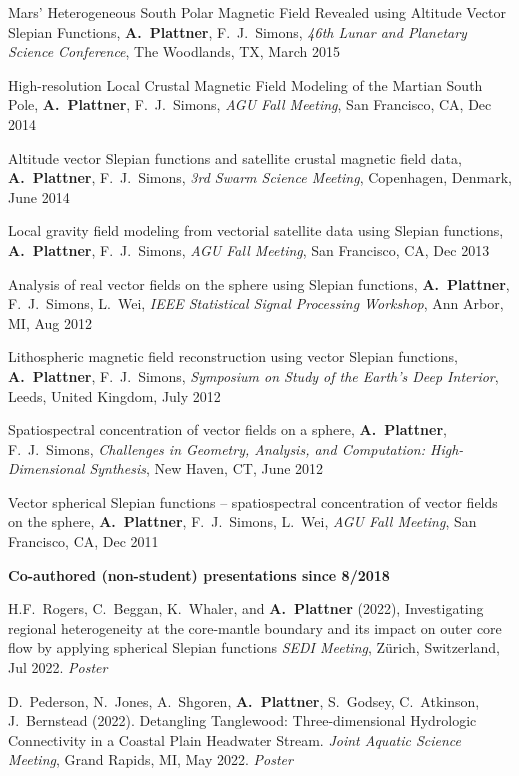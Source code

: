 \documentclass[10pt]{article}
\begin{document}
\spcp
Mars' Heterogeneous South Polar Magnetic Field Revealed using Altitude Vector Slepian Functions,
\textbf{A.~Plattner},  F.~J.~Simons,
\emph{46th Lunar and Planetary Science Conference}, The Woodlands, TX, March 2015

\clearpage
High-resolution Local Crustal Magnetic Field Modeling of the Martian South Pole,
\textbf{A.~Plattner},  F.~J.~Simons,
\emph{AGU Fall Meeting}, San Francisco, CA, Dec 2014

\spcp
Altitude vector Slepian functions and satellite crustal magnetic field data,
\textbf{A.~Plattner},  F.~J.~Simons,
\emph{3rd Swarm Science Meeting}, Copenhagen, Denmark, June 2014

\spcp
Local gravity field modeling from vectorial satellite data using Slepian functions,
\textbf{A.~Plattner},  F.~J.~Simons,
\emph{AGU Fall Meeting}, San Francisco, CA, Dec 2013

\spcp
Analysis of real vector fields on the sphere using Slepian functions,
\textbf{A.~Plattner}, F.~J.~Simons, L.~Wei,
\emph{IEEE Statistical Signal Processing Workshop}, Ann Arbor, MI, Aug 2012

\spcp
Lithospheric magnetic field reconstruction using vector Slepian functions,
\textbf{A.~Plattner}, F.~J.~Simons,
\emph{Symposium on Study of the Earth's Deep Interior}, Leeds, United Kingdom, July 2012

\spcp
Spatiospectral concentration of vector fields on a sphere,
\textbf{A.~Plattner}, F.~J.~Simons,
\emph{Challenges in Geometry, Analysis, and Computation: High-Dimensional Synthesis}, 
New Haven, CT, June 2012

\spcp
Vector spherical Slepian functions -- spatiospectral concentration of vector fields on the sphere,
\textbf{A.~Plattner}, F.~J.~Simons, L.~Wei,
\emph{AGU Fall Meeting}, San Francisco, CA, Dec 2011


\spc
\textbf{\tsize Co-authored (non-student) presentations since 8/2018}

\spcp H.F.~Rogers, C.~Beggan, K.~Whaler, and \textbf{A.~Plattner}
(2022), Investigating regional heterogeneity at the core-mantle
boundary and its impact on outer core flow by applying spherical
Slepian functions \emph{SEDI Meeting}, Z\"urich, Switzerland, Jul 2022. \emph{Poster}

\spcp D.~Pederson, N.~Jones, A.~Shgoren, \textbf{A.~Plattner},
S.~Godsey, C.~Atkinson, J.~Bernstead (2022). Detangling Tanglewood:
Three-dimensional Hydrologic Connectivity in a Coastal Plain Headwater
Stream. \emph{Joint Aquatic Science Meeting}, Grand Rapids, MI, May
2022. \emph{Poster}
\end{document}
